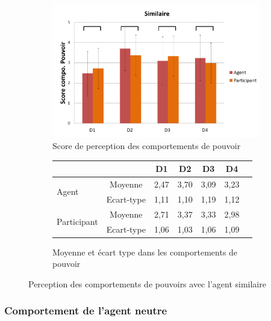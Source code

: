 	
		\begin{figure}[h]
		\centering
		\begin{subfigure}[h]{0.8\textwidth}
			\centering
			\includegraphics[clip=false]{Figures/chap7/simPow.PNG}
			\caption{Score de perception des comportements de pouvoir}
		\end{subfigure}
		
		\begin{subfigure}[h]{0.8\textwidth}
			\centering
			\begin{tabular}{l c c c c c c}
				\hline\hline
				\multicolumn{2}{c}{} & \textbf{D1} & \textbf{D2} & \textbf{D3} & \textbf{D4} \\
				\hline
				
				\multirow{2}{*}{Agent }& Moyenne & 2,47 & 3,70 & 3,09 & 3,23 \\
				& Ecart-type & 1,11 & 1,10 & 1,19 & 1,12 \\
				
				\hline
				\multirow{2}{*}{Participant }& Moyenne & 2,71 & 3,37 & 3,33 & 2,98 \\
				& Ecart-type & 1,06 & 1,03 & 1,06 & 1,09\\
				\hline \hline
				
			\end{tabular}
			\caption{Moyenne et écart type dans les comportements de pouvoir}
		\end{subfigure}
		\caption{Perception des comportements de pouvoirs avec l'agent similaire}
		\label{fig:sim}
	\end{figure}
	\subsubsection{Comportement de l'agent neutre}
	
